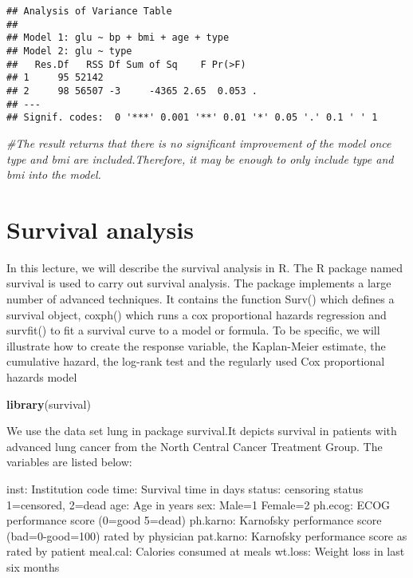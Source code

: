 \documentclass[]{book}
\newenvironment{Shaded}{\begin{snugshade}}{\end{snugshade}}
\newcommand{\KeywordTok}[1]{\textcolor[rgb]{0.13,0.29,0.53}{\textbf{#1}}}
\newcommand{\CommentTok}[1]{\textcolor[rgb]{0.56,0.35,0.01}{\textit{#1}}}
\newcommand{\NormalTok}[1]{#1}
\theoremstyle{definition}
\theoremstyle{definition}
\theoremstyle{definition}
\theoremstyle{remark}
\begin{document}
\begin{verbatim}
## Analysis of Variance Table
## 
## Model 1: glu ~ bp + bmi + age + type
## Model 2: glu ~ type
##   Res.Df   RSS Df Sum of Sq    F Pr(>F)  
## 1     95 52142                           
## 2     98 56507 -3     -4365 2.65  0.053 .
## ---
## Signif. codes:  0 '***' 0.001 '**' 0.01 '*' 0.05 '.' 0.1 ' ' 1
\end{verbatim}

\begin{Shaded}
\begin{Highlighting}[]
\CommentTok{#The result returns that  there is no significant improvement of the model once type and bmi are included.Therefore, it may be enough to only include type and bmi into the model.}
\end{Highlighting}
\end{Shaded}

\chapter{Survival analysis}\label{survival-analysis}

In this lecture, we will describe the survival analysis in R. The R
package named survival is used to carry out survival analysis. The
package implements a large number of advanced techniques. It contains
the function Surv() which defines a survival object, coxph() which runs
a cox proportional hazards regression and survfit() to fit a survival
curve to a model or formula. To be specific, we will illustrate how to
create the response variable, the Kaplan-Meier estimate, the cumulative
hazard, the log-rank test and the regularly used Cox proportional
hazards model

\begin{Shaded}
\begin{Highlighting}[]
\KeywordTok{library}\NormalTok{(survival)}
\end{Highlighting}
\end{Shaded}

We use the data set lung in package survival.It depicts survival in
patients with advanced lung cancer from the North Central Cancer
Treatment Group. The variables are listed below:

inst: Institution code time: Survival time in days status: censoring
status 1=censored, 2=dead age: Age in years sex: Male=1 Female=2
ph.ecog: ECOG performance score (0=good 5=dead) ph.karno: Karnofsky
performance score (bad=0-good=100) rated by physician pat.karno:
Karnofsky performance score as rated by patient meal.cal: Calories
consumed at meals wt.loss: Weight loss in last six months
\end{document}
